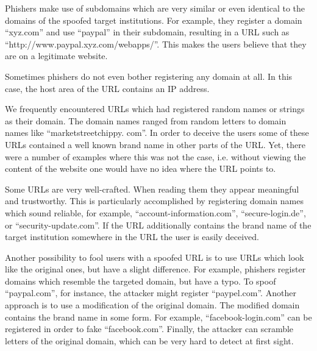 \begin{description}[leftmargin=0cm]
	\item[Subdomain] Phishers make use of subdomains which are very similar or even identical to the domains of the spoofed target institutions.
 For example, they register a domain  ``xyz.com'' and use ``paypal'' in their subdomain, resulting in a URL such as ``http://www.paypal.xyz.com/webapps/''.
 This makes the users believe that they are on a legitimate website.

	\item[IP Address] Sometimes phishers do not even bother registering any domain at all.
 In this case, the host area of the URL contains an IP address.

	\item[Nonsense Domain] We frequently encountered URLs which had registered random names or strings as their domain.
 The domain names ranged from random letters to domain names like ``marketstreetchippy.
com''. In order to deceive the users some of these URLs contained a well known brand name in other parts of the URL.
Yet, there were a number of examples where this was not the case, i.e. without viewing the content of the website one would have no idea where the URL points to.

	\item[Trustworthy, but Unrelated Domain] Some URLs are very well-crafted.
 When reading them they appear meaningful and trustworthy.
 This is particularly accomplished by registering domain names which sound reliable, for example, ``account-information.com'', ``secure-login.de'', or ``security-update.com''. If the URL additionally contains the brand name of the target institution somewhere in the URL the user is easily deceived.

	\item[Similar and Deceptive Domains] Another possibility to fool users with a spoofed URL is to use URLs which look like the original ones, but have a slight difference.
 For example, phishers register domains which resemble the targeted domain, but have a typo.
 To spoof ``paypal.com'', for instance, the attacker might register ``paypel.com''. Another approach is to use a modification of the original domain.
 The modified domain contains the brand name in some form.
 For example, ``facebook-login.com'' can be registered in order to fake ``facebook.com''. Finally, the attacker can scramble letters of the original domain, which can be very hard to detect at first sight.


\end{description}
